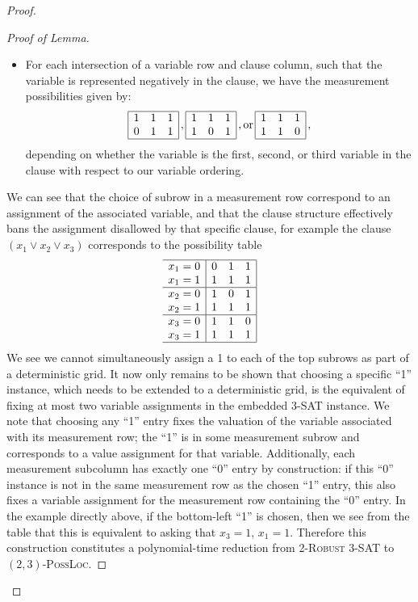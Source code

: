 \documentclass[reprint]{revtex4-1}
\theoremstyle{definition}
\begin{document}
\begin{proof}
\begin{proof}[Proof of Lemma]
\begin{itemize}
\item For each intersection of a variable row and clause column, such that the variable is represented negatively in the clause, we have the measurement possibilities given by:
\begin{equation*}
\begin{array}{  | c c  c|}
\hline
 1 & 1 & 1 \\
 0 & 1& 1 \\ \hline
 \end{array}\, ,
 \begin{array}{  | c c  c|}
\hline
 1 &1 & 1 \\
 1 & 0& 1 \\ \hline
 \end{array} \, ,
 \mbox{or} \,
 \begin{array}{  | c c  c|}
\hline
 1 & 1 & 1\\
 1 & 1& 0 \\ \hline
 \end{array}\, ,
 \end{equation*}
depending on whether the variable is the first, second, or third variable in the clause with respect to our variable ordering.
\end{itemize}
We can see that the choice of subrow in a measurement row correspond to an assignment of the associated variable, and that the clause structure effectively bans the assignment disallowed by that specific clause, for example the clause $(x_1 \vee x_2 \vee x_3)$ corresponds to the possibility table
\begin{equation*}
\begin{array}{c  | c c  c|}
\hline
 x_1=0&0 & 1 & 1 \\
 x_1=1&1 & 1& 1 \\ \hline
 x_2=0&1 &0 & 1 \\
x_2=1& 1 & 1& 1 \\ \hline
x_3=0& 1 & 1 & 0\\
x_3=1& 1 & 1& 1 \\ \hline
 \end{array}
 \end{equation*}
We see we cannot simultaneously assign a 1 to each of the top subrows as part of a deterministic grid. It now only remains to be shown that choosing a specific ``1'' instance, which needs to be extended to a deterministic grid, is the equivalent of fixing at most two variable assignments in the embedded \textsc{3-SAT} instance. We note that choosing any ``1'' entry fixes the valuation of the variable associated with its measurement row; the ``1'' is in some measurement subrow and corresponds to a value assignment for that variable. Additionally, each measurement subcolumn has exactly one ``0'' entry by construction: if this ``0'' instance is not in the same measurement row as the chosen ``1'' entry, this also fixes a variable assignment for the measurement row containing the ``0'' entry. In the example directly above, if the bottom-left ``1'' is chosen, then we see from the table that this is equivalent to asking that $x_3=1$, $x_1=1$. Therefore this construction constitutes a polynomial-time reduction from \textsc{2-Robust 3-SAT} to $(2,3)$\textsc{-PossLoc}.



\end{proof}
\end{proof}
\end{document}
